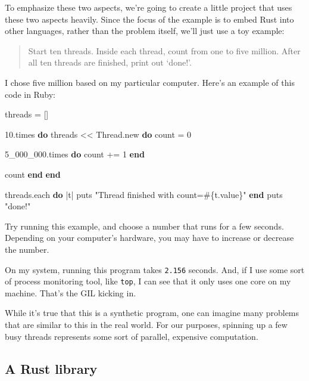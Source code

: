 \documentclass[a4paper,]{book}
\newenvironment{Shaded}{\begin{snugshade}}{\end{snugshade}}
\newcommand{\KeywordTok}[1]{\textcolor[rgb]{0.13,0.29,0.53}{\textbf{{#1}}}}
\newcommand{\DataTypeTok}[1]{\textcolor[rgb]{0.13,0.29,0.53}{{#1}}}
\newcommand{\DecValTok}[1]{\textcolor[rgb]{0.00,0.00,0.81}{{#1}}}
\newcommand{\StringTok}[1]{\textcolor[rgb]{0.31,0.60,0.02}{{#1}}}
\newcommand{\OtherTok}[1]{\textcolor[rgb]{0.56,0.35,0.01}{{#1}}}
\newcommand{\NormalTok}[1]{{#1}}
\begin{document}
To emphasize these two aspects, we're going to create a little project
that uses these two aspects heavily. Since the focus of the example is
to embed Rust into other languages, rather than the problem itself,
we'll just use a toy example:

\begin{quote}
Start ten threads. Inside each thread, count from one to five million.
After all ten threads are finished, print out `done!'.
\end{quote}

I chose five million based on my particular computer. Here's an example
of this code in Ruby:

\begin{Shaded}
\begin{Highlighting}[]
\NormalTok{threads = []}

\DecValTok{10}\NormalTok{.times }\KeywordTok{do}
  \NormalTok{threads << }\DataTypeTok{Thread}\NormalTok{.new }\KeywordTok{do}
    \NormalTok{count = }\DecValTok{0}

    \DecValTok{5_000_000}\NormalTok{.times }\KeywordTok{do}
      \NormalTok{count += }\DecValTok{1}
    \KeywordTok{end}

    \NormalTok{count}
  \KeywordTok{end}
\KeywordTok{end}

\NormalTok{threads.each }\KeywordTok{do} \NormalTok{|t|}
  \NormalTok{puts }\StringTok{"Thread finished with count=}\OtherTok{#\{}\NormalTok{t.value}\OtherTok{\}}\StringTok{"}
\KeywordTok{end}
\NormalTok{puts }\StringTok{"done!"}
\end{Highlighting}
\end{Shaded}

Try running this example, and choose a number that runs for a few
seconds. Depending on your computer's hardware, you may have to increase
or decrease the number.

On my system, running this program takes \texttt{2.156} seconds. And, if
I use some sort of process monitoring tool, like \texttt{top}, I can see
that it only uses one core on my machine. That's the GIL kicking in.

While it's true that this is a synthetic program, one can imagine many
problems that are similar to this in the real world. For our purposes,
spinning up a few busy threads represents some sort of parallel,
expensive computation.

\subsection{A Rust library}\label{a-rust-library}
\end{document}
